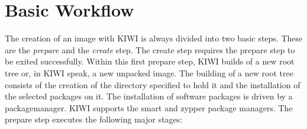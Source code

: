 \chapter{Basic Workflow}
\label{chapter:workflow}
\minitoc

The creation of an image with KIWI is always divided into two
basic steps. These are the \emph{prepare} and the \emph{create}
step. The create step requires the prepare step to be exited
successfully. Within this first prepare step, KIWI builds of a new root
tree or, in KIWI speak, a new unpacked image. The building of a new
root tree consists of the creation of the directory specified to
hold it and the installation of the selected packages on it. The
installation of software packages is driven by a packagemanager.
KIWI supports the smart and zypper package managers. The prepare
step executes the following major stages:

